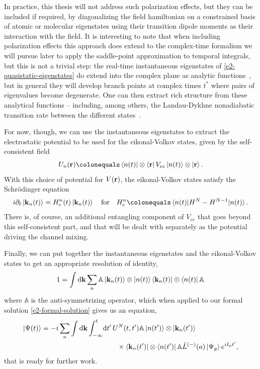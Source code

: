 In practice, this thesis will not address such polarization effects, but they can be included if required, by diagonalizing the field hamiltonian on a constrained basis of atomic or molecular eigenstates using their transition dipole moments as their interaction with the field. It is interesting to note that when including polarization effects this approach does extend to the complex-time formalism we will pursue later to apply the saddle-point approximation to temporal integrals, but this is not a trivial step: the real-time instantaneous eigenstates of \eqref{e2-quasistatic-eigenstates} do extend into the complex plane as analytic functions~\cite{hwang_adiabatic_1977, pechukas_analytic_1976}, but in general they will develop branch points at complex times $t^*$ where pairs of eigenvalues become degenerate. One can then extract rich structure from these analytical functions -- including, among others, the Landau-Dykhne nonadiabatic transition rate between the different states~\cite{dykhne_adiabatic_1962, hwang_adiabatic_1977}.


For now, though, we can use the instantaneous eigenstates to extract the electrostatic potential to be used for the eikonal-Volkov states, given by the self-consistent field
\begin{equation}
U_n(\vb{r})\colonequals \bra{n(t)}\otimes\bra{\vb{r}}V_{ee}\ket{n(t)}\otimes\ket{\vb{r}}.
\label{e2-channel-specific-potential}
\end{equation}
With this choice of potential for $V(\vb{r})$, the eikonal-Volkov states satisfy the Schrödinger equation
\begin{equation}
i\partial_t\ket{\vb{k}_n(t)}=H_e^n(t)\ket{\vb{k}_n(t)}
\qq{for}
H_e^n\colonequals \matrixel{n(t)}{H^N-H^{N-1}}{n(t)}.
\label{e2-channel-specific-eikonal-tdse}
\end{equation}
There is, of course, an additional entangling component of $V_{ee}$ that goes beyond this self-consistent part, and that will be dealt with separately as the potential driving the channel mixing.

Finally, we can put together the instantaneous eigenstates and the eikonal-Volkov states to get an appropriate resolution of identity,
\begin{align}
1=\int\mathrm{d}\vb{k}\sum_n
\mathbb{A}\ket{\vb{k}_n(t)}\otimes\ket{n(t)}\bra{\vb{k}_n(t)}\otimes\bra{n(t)}\mathbb{A}
\label{e2-resolutionofidentity}
\end{align}
where $\mathbb{A}$ is the anti-symmetrizing operator, which when applied to our formal solution \eqref{e2-formal-solution} gives us an equation,
\begin{align}
\ket{\Psi(t)}
= -i\sum_n\int\mathrm{d}\vb{k}\int_{-\infty}^t  &  \mathrm{d} t' \, U^N(t,t')\mathbb{A}\ket{n(t')}\otimes\ket{\vb{k}_n(t')}
\nonumber \\ & \qquad   \times \bra{\vb{k}_n(t')}\otimes\bra{n(t')}\mathbb{A}\hat{L}^{(-)}(a)\ket{\Psi_g}e^{iI_p t'},
\label{e2-channel-specific-formal-solution}
\end{align}
that is ready for further work.



